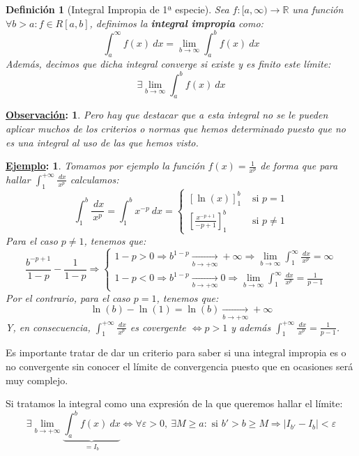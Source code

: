 \documentclass[10pt,a4paper,openright]{book}
\theoremstyle{break}
\newtheorem*{defi}{Definición}
\newtheorem*{obs}{\underline{Observación}:}
\newtheorem*{ej}{\underline{Ejemplo}:}
\newcommand{\dif}[1]{\ d#1}
\begin{document}
\begin{defi}[Integral Impropia de 1ª especie]
Sea $f:[a,\infty)\rightarrow  \mathbb R$ una función $\forall b>a : f\in R[a,b]$, definimos la \textbf{integral impropia} como:
$$\int_{a}^{\infty} f(x)\dif{x} = \lim_{b \to \infty} \int_{a}^{b} f(x)\dif{x}$$
Además, decimos que dicha integral converge si existe y es finito este límite:
$$\exists \lim_{b \to \infty} \int_{a}^{b} f(x)\dif{x} $$
\end{defi}

\begin{obs}
Pero hay que destacar que a esta integral no se le pueden aplicar muchos de los criterios o normas que hemos determinado puesto que no es una integral al uso de las que hemos visto.
\end{obs}

\begin{ej}
Tomamos por ejemplo la función $f(x) =\frac{1}{x^p}$ de forma que para hallar $\displaystyle \int_{1}^{+\infty} \frac{\dif{x}}{x^p}$ calculamos:
$$\int_{1}^{b} \frac{\dif{x}}{x^p} = \int_{1}^{b} x^{-p} \dif{x} = \begin{cases} \displaystyle [\ln(x)]^b_1 & \mbox{ si } p=1 \\ \displaystyle \left[\frac{x^{-p+1}}{-p+1}\right]^b_1 & \mbox{ si } p \neq 1\end{cases}$$
Para el caso $p\neq 1$, tenemos que:
$$\frac{b^{-p+1}}{1-p} - \frac{1}{1-p} \Rightarrow
\begin{cases}
1-p > 0 \Rightarrow b^{1-p} \underset{b \to +\infty} {\longrightarrow
}+\infty \Rightarrow \displaystyle \lim_{b \to \infty} \int_{1}^{\infty} \frac{\dif{x}}{x^p} = \infty 
\\
1-p<0 \Rightarrow b^{1-p} \underset{b \to +\infty}{\longrightarrow
} 0 \Rightarrow \displaystyle\lim_{b \to \infty} \int_{1}^{\infty} \frac{\dif{x}}{x^p} = \frac{1}{p-1}
\end{cases}
$$
Por el contrario, para el caso $p=1$, tenemos que:
$$\ln(b)-\ln(1) = \ln(b) \underset{b \to +\infty}{\longrightarrow}+\infty$$
Y, en consecuencia, $\displaystyle \int_{1}^{+\infty} \frac{\dif{x}}{x^p}$ es covergente $\Leftrightarrow  p > 1$ y además $\displaystyle \int_{1}^{+\infty} \frac{\dif{x}}{x^p} = \frac{1}{p-1}$.
\end{ej}

Es importante tratar de dar un criterio para saber si una integral impropia es o no convergente sin conocer el límite de convergencia puesto que en ocasiones será muy complejo.

Si tratamos la integral como una expresión de la que queremos hallar el límite:
$$\exists \lim_{b \to +\infty} \underbrace{\int_{a}^{b} f(x)\dif{x}}_{=I_b} \Leftrightarrow \forall \varepsilon > 0,\ \exists M \geq a: \mbox{ si } b'>b\geq M \Rightarrow |I_{b'} - I_b| < \varepsilon$$
\end{document}

